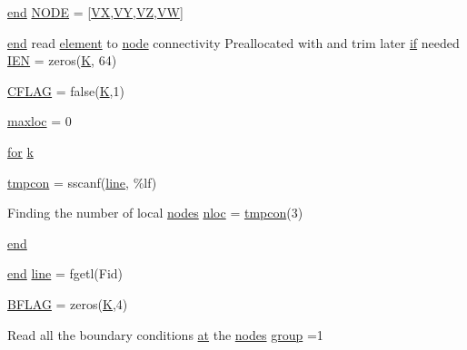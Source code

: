 \begin{DoxyCompactItemize}
\item 
\hyperlink{a00608_afb358f48b1646c750fb9da6c6585be2b}{end} \hyperlink{a00608_a5b72722269640873d2b15c2b7fa0ae25}{N\+O\+DE} = \mbox{[}\hyperlink{a00608_a6339563199f1df5b474ae537cd435e9b}{VX}\textquotesingle{},\hyperlink{a00608_a2f2925c90dcdcd0458fa06a0d2fc2fc4}{VY}\textquotesingle{},\hyperlink{a00608_a19fb6d0c72728c85075e94ea04a60a66}{VZ}\textquotesingle{},\hyperlink{a00608_a279fc4bc04d1e6cb4941402ba6e29874}{VW}\textquotesingle{}\mbox{]}
\item 
\hyperlink{a00608_afb358f48b1646c750fb9da6c6585be2b}{end} read \hyperlink{a00611_a4998e7f4989562d1ed06579e07265c30}{element} to \hyperlink{a00611_adf51fe9945b6ca147057cc27ff639d0f}{node} connectivity Preallocated with and trim later \hyperlink{a00614_a96c738d3e2120c4273f9d4390761d99e}{if} needed \hyperlink{a00608_ab08108f8909c2d9138c9e93413f7b6b9}{I\+EN} = zeros(\hyperlink{a00608_a16e4ef534cec559430e07e05eb71c719}{K}, 64)
\item 
\hyperlink{a00608_a10675f132896e92909100dff33d2eca1}{C\+F\+L\+AG} = false(\hyperlink{a00608_a16e4ef534cec559430e07e05eb71c719}{K},1)
\item 
\hyperlink{a00608_a61dd2deb1d38e8c3ab02d6c21f123827}{maxloc} = 0
\item 
\hyperlink{a00623_ad1e7380d51df1e0043d24d3c8a860e0a}{for} \hyperlink{a00608_a1c73327b2882639bc9f5e416bb3cc7ac}{k}
\item 
\hyperlink{a00608_a5045c084f6326df32321bc89975fc314}{tmpcon} = sscanf(\hyperlink{a00608_a1d1b0d42391bd99b4214d9216b163807}{line}, \textquotesingle{}\%lf\textquotesingle{})
\item 
Finding the number of local \hyperlink{a00608_a9fd973fb7dcbed4123ae5eb2f3868e61}{nodes} \hyperlink{a00608_af770575536260d1af58b8fddaaefb98d}{nloc} = \hyperlink{a00608_ac90fbb5b14a3c144a13164ba8eff726a}{tmpcon}(3)
\item 
\hyperlink{a00608_afb358f48b1646c750fb9da6c6585be2b}{end}
\item 
\hyperlink{a00608_afb358f48b1646c750fb9da6c6585be2b}{end} \hyperlink{a00608_a1d1b0d42391bd99b4214d9216b163807}{line} = fgetl(Fid)
\item 
\hyperlink{a00608_a3ae52850c5599fbb0af6b0dbf49b63a1}{B\+F\+L\+AG} = zeros(\hyperlink{a00608_a16e4ef534cec559430e07e05eb71c719}{K},4)
\item 
Read all the boundary conditions \hyperlink{a00560_a887f3ec6f2ead88f5c878fe6223927ea}{at} the \hyperlink{a00608_a9fd973fb7dcbed4123ae5eb2f3868e61}{nodes} \hyperlink{a00608_a13dcc74bebe8895ff73eeb1234135704}{group} =1

\end{DoxyCompactItemize}
